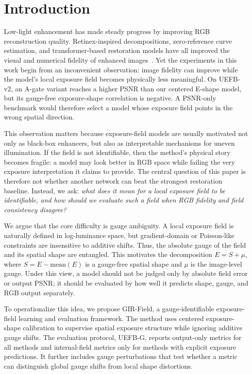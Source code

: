\section{Introduction}
\label{sec:introduction}

Low-light enhancement has made steady progress by improving RGB reconstruction quality. Retinex-inspired decompositions, zero-reference curve estimation, and transformer-based restoration models have all improved the visual and numerical fidelity of enhanced images~\cite{land1971retinex,wei2018deepretinex,zhang2019kind,guo2020zerodce,li2021zerodcepp,cai2023retinexformer}. Yet the experiments in this work begin from an inconvenient observation: image fidelity can improve while the model's local exposure field becomes physically less meaningful. On UEFB-v2, an A-gate variant reaches a higher PSNR than our centered E-shape model, but its gauge-free exposure-shape correlation is negative. A PSNR-only benchmark would therefore select a model whose exposure field points in the wrong spatial direction.

This observation matters because exposure-field models are usually motivated not only as black-box enhancers, but also as interpretable mechanisms for uneven illumination. If the field is not identifiable, then the method's physical story becomes fragile: a model may look better in RGB space while failing the very exposure interpretation it claims to provide. The central question of this paper is therefore not whether another network can beat the strongest restoration baseline. Instead, we ask: \emph{what does it mean for a local exposure field to be identifiable, and how should we evaluate such a field when RGB fidelity and field consistency disagree?}

We argue that the core difficulty is gauge ambiguity. A local exposure field is naturally defined in log-luminance space, but gradient-domain or Poisson-like constraints are insensitive to additive shifts. Thus, the absolute gauge of the field and its spatial shape are entangled. This motivates the decomposition $E=S+\mu$, where $S=E-\mathrm{mean}(E)$ is a gauge-free spatial shape and $\mu$ is the image-level gauge. Under this view, a model should not be judged only by absolute field error or output PSNR; it should be evaluated by how well it predicts shape, gauge, and RGB output separately.

To operationalize this idea, we propose GIR-Field, a gauge-identifiable exposure-field learning and evaluation framework. The method uses centered exposure-shape calibration to supervise spatial exposure structure while ignoring additive gauge shifts. The evaluation protocol, UEFB-G, reports output-only metrics for all methods and internal-field metrics only for methods with explicit exposure predictions. It further includes gauge perturbations that test whether a metric can distinguish global gauge shifts from local shape distortions.


